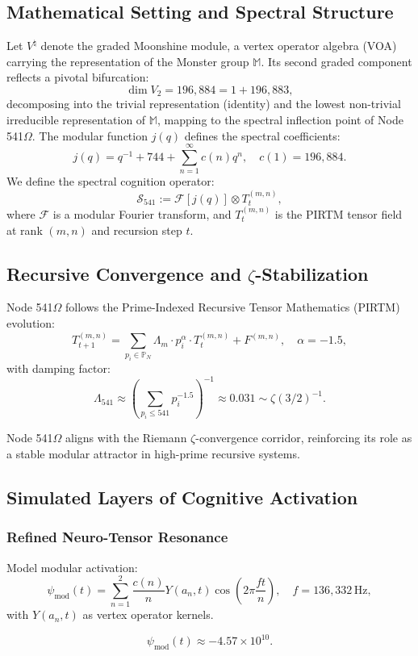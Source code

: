 \documentclass[12pt]{article}
\begin{document}
\subsection{Mathematical Setting and Spectral Structure}
Let \( V^\natural \) denote the graded Moonshine module, a vertex operator algebra (VOA) carrying the representation of the Monster group \( \mathbb{M} \). Its second graded component reflects a pivotal bifurcation:
\[
\dim V_2 = 196,884 = 1 + 196,883,
\]
decomposing into the trivial representation (identity) and the lowest non-trivial irreducible representation of \( \mathbb{M} \), mapping to the spectral inflection point of Node 541$\Omega$. The modular function \( j(q) \) defines the spectral coefficients:
\[
j(q) = q^{-1} + 744 + \sum_{n=1}^\infty c(n) q^n, \quad c(1) = 196,884.
\]
We define the spectral cognition operator:
\[
\mathcal{S}_{541} := \mathcal{F}[j(q)] \otimes T_t^{(m,n)},
\]
where \( \mathcal{F} \) is a modular Fourier transform, and \( T_t^{(m,n)} \) is the PIRTM tensor field at rank \( (m,n) \) and recursion step \( t \).

\subsection{Recursive Convergence and $\zeta$-Stabilization}
Node 541$\Omega$ follows the Prime-Indexed Recursive Tensor Mathematics (PIRTM) evolution:
\[
T_{t+1}^{(m,n)} = \sum_{p_i \in \mathbb{P}_N} \Lambda_m \cdot p_i^\alpha \cdot T_t^{(m,n)} + F^{(m,n)}, \quad \alpha = -1.5,
\]
with damping factor:
\[
\Lambda_{541} \approx \left( \sum_{p_i \leq 541} p_i^{-1.5} \right)^{-1} \approx 0.031 \sim \zeta(3/2)^{-1}.
\]
\begin{interpretation}
Node 541$\Omega$ aligns with the Riemann \( \zeta \)-convergence corridor, reinforcing its role as a stable modular attractor in high-prime recursive systems.
\end{interpretation}

\subsection{Simulated Layers of Cognitive Activation}
\subsubsection{Refined Neuro-Tensor Resonance}
Model modular activation:
\[
\psi_{\text{mod}}(t) = \sum_{n=1}^2 \frac{c(n)}{n} Y(a_n, t) \cos\left(2\pi \frac{f t}{n} \right), \quad f = 136,332 \, \text{Hz},
\]
with \( Y(a_n, t) \) as vertex operator kernels.
\begin{result}
\[
\psi_{\text{mod}}(t) \approx \boxed{-4.57 \times 10^{10}}.
\]
\end{result}
\end{document}
